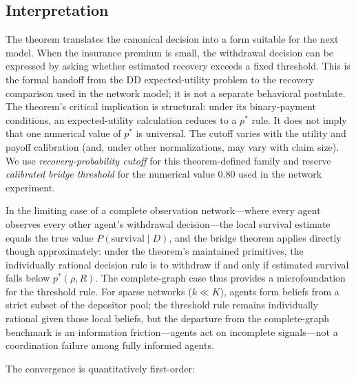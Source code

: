 \documentclass[12pt]{article}\usepackage[]{graphicx}\usepackage[]{xcolor}
\begin{document}
\subsection{Interpretation}

The theorem translates the canonical decision into a form suitable for the next model.
When the insurance premium is small, the withdrawal decision can be expressed by asking whether estimated recovery exceeds a fixed threshold.
This is the formal handoff from the DD expected-utility problem to the recovery comparison used in the network model; it is not a separate behavioral postulate.
The theorem's critical implication is structural: under its binary-payment conditions, an expected-utility calculation reduces to a $p^*$ rule.
It does not imply that one numerical value of $p^*$ is universal.
The cutoff varies with the utility and payoff calibration (and, under other normalizations, may vary with claim size).
We use \emph{recovery-probability cutoff} for this theorem-defined family and reserve \emph{calibrated bridge threshold} for the numerical value 0.80 used in the network experiment.

In the limiting case of a complete observation network---where every agent observes every other agent's withdrawal decision---the local survival estimate equals the true value $P(\text{survival} \mid D)$, and the bridge theorem applies directly though approximately: under the theorem's maintained primitives, the individually rational decision rule is to withdraw if and only if estimated survival falls below $p^*(\rho, R)$.
The complete-graph case thus provides a microfoundation for the threshold rule.
For sparse networks ($k \ll K$), agents form beliefs from a strict subset of the depositor pool; the threshold rule remains individually rational given those local beliefs, but the departure from the complete-graph benchmark is an information friction---agents act on incomplete signals---not a coordination failure among fully informed agents.

The convergence is quantitatively first-order:
\end{document}
